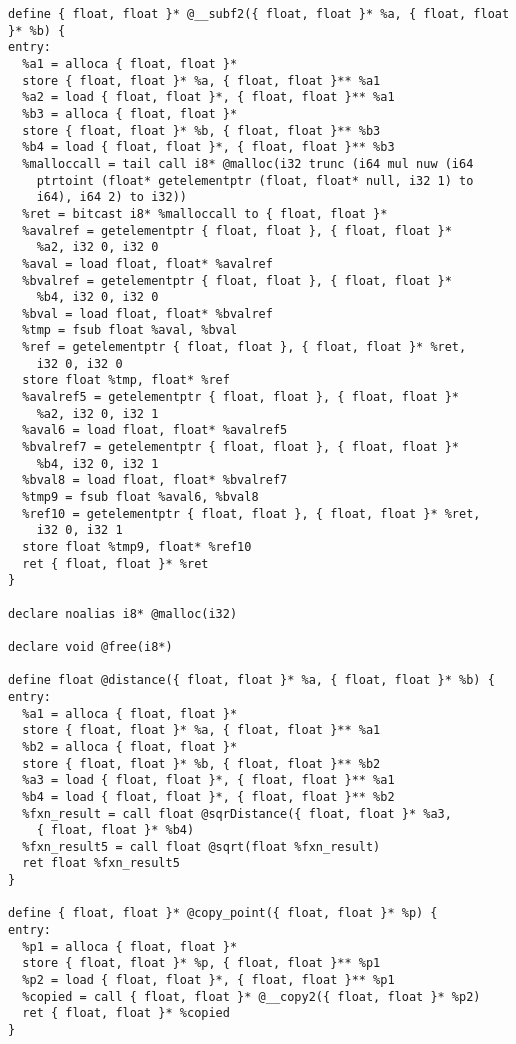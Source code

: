 \documentclass[main.tex]{subfiles}
\begin{document}
{\begin{lstlisting}
define { float, float }* @__subf2({ float, float }* %a, { float, float }* %b) {
entry:
  %a1 = alloca { float, float }*
  store { float, float }* %a, { float, float }** %a1
  %a2 = load { float, float }*, { float, float }** %a1
  %b3 = alloca { float, float }*
  store { float, float }* %b, { float, float }** %b3
  %b4 = load { float, float }*, { float, float }** %b3
  %malloccall = tail call i8* @malloc(i32 trunc (i64 mul nuw (i64 
    ptrtoint (float* getelementptr (float, float* null, i32 1) to 
    i64), i64 2) to i32))
  %ret = bitcast i8* %malloccall to { float, float }*
  %avalref = getelementptr { float, float }, { float, float }*
    %a2, i32 0, i32 0
  %aval = load float, float* %avalref
  %bvalref = getelementptr { float, float }, { float, float }*
    %b4, i32 0, i32 0
  %bval = load float, float* %bvalref
  %tmp = fsub float %aval, %bval
  %ref = getelementptr { float, float }, { float, float }* %ret,
    i32 0, i32 0
  store float %tmp, float* %ref
  %avalref5 = getelementptr { float, float }, { float, float }*
    %a2, i32 0, i32 1
  %aval6 = load float, float* %avalref5
  %bvalref7 = getelementptr { float, float }, { float, float }*
    %b4, i32 0, i32 1
  %bval8 = load float, float* %bvalref7
  %tmp9 = fsub float %aval6, %bval8
  %ref10 = getelementptr { float, float }, { float, float }* %ret,
    i32 0, i32 1
  store float %tmp9, float* %ref10
  ret { float, float }* %ret
}

declare noalias i8* @malloc(i32)

declare void @free(i8*)

define float @distance({ float, float }* %a, { float, float }* %b) {
entry:
  %a1 = alloca { float, float }*
  store { float, float }* %a, { float, float }** %a1
  %b2 = alloca { float, float }*
  store { float, float }* %b, { float, float }** %b2
  %a3 = load { float, float }*, { float, float }** %a1
  %b4 = load { float, float }*, { float, float }** %b2
  %fxn_result = call float @sqrDistance({ float, float }* %a3, 
    { float, float }* %b4)
  %fxn_result5 = call float @sqrt(float %fxn_result)
  ret float %fxn_result5
}

define { float, float }* @copy_point({ float, float }* %p) {
entry:
  %p1 = alloca { float, float }*
  store { float, float }* %p, { float, float }** %p1
  %p2 = load { float, float }*, { float, float }** %p1
  %copied = call { float, float }* @__copy2({ float, float }* %p2)
  ret { float, float }* %copied
}


\end{lstlisting}}
\end{document}
